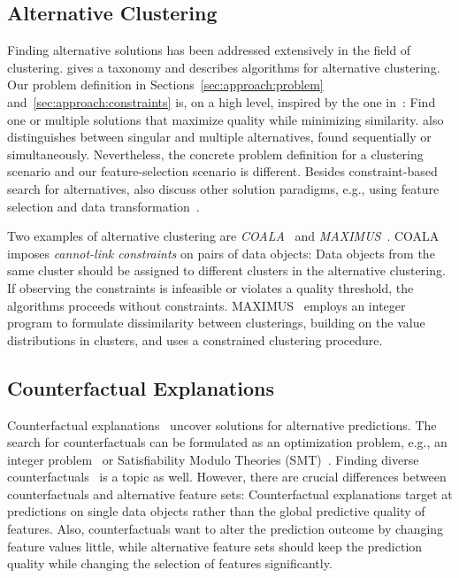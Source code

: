 \documentclass{article}
\theoremstyle{definition}
\begin{document}
\subsection{Alternative Clustering}

Finding alternative solutions has been addressed extensively in the field of clustering.
\cite{bailey2014alternative} gives a taxonomy and describes algorithms for alternative clustering.
Our problem definition in Sections~\ref{sec:approach:problem} and~\ref{sec:approach:constraints} is, on a high level, inspired by the one in~\cite{bailey2014alternative}:
Find one or multiple solutions that maximize quality while minimizing similarity.
\cite{bailey2014alternative} also distinguishes between singular and multiple alternatives, found sequentially or simultaneously.
Nevertheless, the concrete problem definition for a clustering scenario and our feature-selection scenario is different.
Besides constraint-based search for alternatives, \cite{bailey2014alternative} also discuss other solution paradigms, e.g., using feature selection and data transformation~\cite{tao2012novel}.

Two examples of alternative clustering are \emph{COALA}~\cite{bae2006coala} and \emph{MAXIMUS}~\cite{bae2010clustering}.
COALA~\cite{bae2006coala} imposes \emph{cannot-link constraints} on pairs of data objects:
Data objects from the same cluster should be assigned to different clusters in the alternative clustering.
If observing the constraints is infeasible or violates a quality threshold, the algorithms proceeds without constraints.
MAXIMUS~\cite{bae2010clustering} employs an integer program to formulate dissimilarity between clusterings, building on the value distributions in clusters, and uses a constrained clustering procedure.

\subsection{Counterfactual Explanations}

Counterfactual explanations~\cite{stepin2021survey, verma2020counterfactual} uncover solutions for alternative predictions.
The search for counterfactuals can be formulated as an optimization problem, e.g., an integer problem~\cite{mohammadi2021scaling} or Satisfiability Modulo Theories (SMT)~\cite{karimi2020model}.
Finding diverse counterfactuals~\cite{mothilal2020explaining} is a topic as well.
However, there are crucial differences between counterfactuals and alternative feature sets:
Counterfactual explanations target at predictions on single data objects rather than the global predictive quality of features.
Also, counterfactuals want to alter the prediction outcome by changing feature values little, while alternative feature sets should keep the prediction quality while changing the selection of features significantly.
\end{document}
